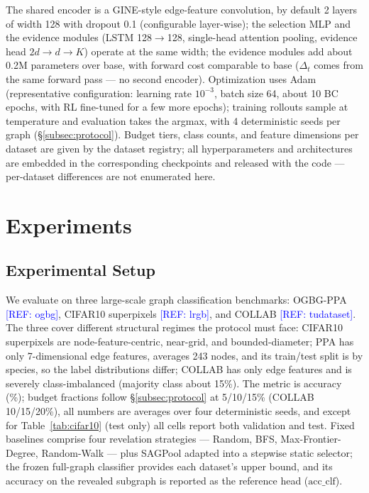 \documentclass{article}
\newcommand{\refadd}[1]{\textcolor{blue}{[REF: #1]}}
\begin{document}
The shared encoder is a GINE-style edge-feature convolution, by default 2 layers of width 128 with dropout 0.1 (configurable layer-wise); the selection MLP and the evidence modules (LSTM 128$\to$128, single-head attention pooling, evidence head $2d{\to}d{\to}K$) operate at the same width; the evidence modules add about 0.2M parameters over base, with forward cost comparable to base ($\Delta_t$ comes from the same forward pass --- no second encoder). Optimization uses Adam (representative configuration: learning rate $10^{-3}$, batch size 64, about 10 BC epochs, with RL fine-tuned for a few more epochs); training rollouts sample at temperature and evaluation takes the argmax, with 4 deterministic seeds per graph (\S\ref{subsec:protocol}). Budget tiers, class counts, and feature dimensions per dataset are given by the dataset registry; all hyperparameters and architectures are embedded in the corresponding checkpoints and released with the code --- per-dataset differences are not enumerated here.

\section{Experiments}
\label{sec:experiments}

\subsection{Experimental Setup}
\label{subsec:exp-setup}

We evaluate on three large-scale graph classification benchmarks: OGBG-PPA \refadd{ogbg}, CIFAR10 superpixels \refadd{lrgb}, and COLLAB \refadd{tudataset}. The three cover different structural regimes the protocol must face: CIFAR10 superpixels are node-feature-centric, near-grid, and bounded-diameter; PPA has only 7-dimensional edge features, averages 243 nodes, and its train/test split is by species, so the label distributions differ; COLLAB has only edge features and is severely class-imbalanced (majority class about 15\%). The metric is accuracy (\%); budget fractions follow \S\ref{subsec:protocol} at 5/10/15\% (COLLAB 10/15/20\%), all numbers are averages over four deterministic seeds, and except for Table~\ref{tab:cifar10} (test only) all cells report both validation and test. Fixed baselines comprise four revelation strategies --- Random, BFS, Max-Frontier-Degree, Random-Walk --- plus SAGPool adapted into a stepwise static selector; the frozen full-graph classifier provides each dataset's upper bound, and its accuracy on the revealed subgraph is reported as the reference head ($\mathrm{acc\_clf}$).
\end{document}
